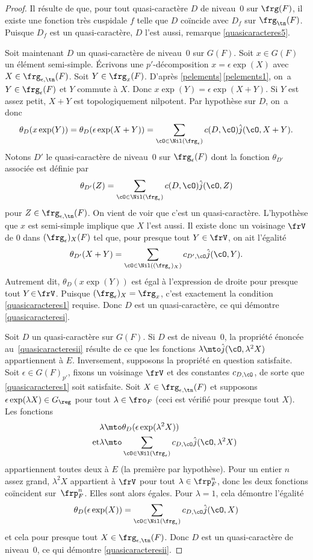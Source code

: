 \begin{proof}
Il résulte de \cite[Lem.\,6.3(iii)]{W1} que, pour tout quasi-caractère $D$ de niveau~$0$ sur $\frg(F)$, il existe une fonction très cuspidale $f$ telle que $D$ coïncide avec $D_{f}$ sur $\frg_{\tn}(F)$. Puisque $D_{f}$ est un quasi-caractère, $D$ l'est aussi, \cf remarque \eqref{quasicaracteres5}.

Soit maintenant $D$ un quasi-caractère de niveau~$0$ sur $G(F)$. Soit $x\in G(F)$ un élément semi-simple. Écrivons une $p'$-décomposition $x=\epsilon \exp(X)$ avec $X\in \frg_{\epsilon,\tn}(F)$. Soit $Y\in \frg_{x}(F)$. D'après \ref{pelements}\,\eqref{pelements1}, on~a $Y\in \frg_{\epsilon}(F)$ et $Y$ commute à $X$. Donc $x\exp(Y)=\epsilon \exp(X+Y)$. Si $Y$ est assez petit, $X+Y$ est topologiquement nilpotent. Par hypothèse sur $D$, on~a donc
\[
\theta_{D}(x \exp(Y))=\theta_{D}(\epsilon \exp(X+Y))=\sum_{\cO\in \Nil(\frg_{\epsilon})}c(D,\cO)\hat{j}(\cO,X+Y).
\]
Notons $D'$ le quasi-caractère de niveau~$0$ sur $\frg_{\epsilon}(F)$ dont la fonction $\theta_{D'}$ associée est définie par
\[
\theta_{D'}(Z)= \sum_{\cO\in \Nil(\frg_{\epsilon})}c(D,\cO)\hat{j}(\cO,Z)
\]
pour $Z\in \frg_{\epsilon,\tn}(F)$. On vient de voir que c'est un quasi-caractère. L'hypothèse que $x$ est semi-simple implique que $X$ l'est aussi. Il existe donc un voisinage $\frV$ de $0$ dans $(\frg_{\epsilon})_{X}(F)$ tel que, pour presque tout $Y\in \frV$, on ait l'égalité
\[
\theta_{D'}(X+Y)=\sum_{\cO\in \Nil((\frg_{\epsilon})_{X})}c_{D',\cO}\hat{j}(\cO,Y).
\]
Autrement dit, $\theta_{D}(x \exp(Y))$ est égal à l'expression de droite pour presque tout \hbox{$Y\!\in\!\frV$}. Puisque $(\frg_{\epsilon})_{X}=\frg_{x}$, c'est exactement la condition \eqref{quasicaracteres1} requise. Donc $D$ est un quasi-caractère, ce qui démontre \eqref{quasicaracteresi}.

Soit $D$ un quasi-caractère sur $G(F)$. Si $D$ est de niveau~$0$, la propriété énoncée au~\eqref{quasicaracteresii} résulte de ce que les fonctions $\lambda\mto \hat{j}(\cO,\lambda^2X)$ appartiennent à $E$. Inversement, supposons la propriété en question satisfaite. Soit $\epsilon\in G(F)_{p'}$, fixons un voisinage $\frV$ et des constantes $c_{D,\cO}$, de sorte que \eqref{quasicaracteres1} soit satisfaite. Soit $X\in \frg_{\epsilon,\tn}(F)$ et supposons $\epsilon \exp(\lambda X)\in G_{\reg}$ pour tout $\lambda\in \fro_{F}$ (ceci est vérifié pour presque tout $X$). Les fonctions
\begin{align*}
\lambda&\mto \theta_{D}(\epsilon \exp(\lambda^2X))
\\
\tag*{et}
\lambda&\mto \sum_{\cO\in \Nil(\frg_{\epsilon})}c_{D,\cO}\hat{j}(\cO,\lambda^2X)
\end{align*}
appartiennent toutes deux à $E$ (la première par hypothèse). Pour un entier $n$ assez grand, $\lambda^2 X$ appartient à $\frV$ pour tout $\lambda\in \frp_{F}^n$, donc les deux fonctions coïncident sur~$\frp_{F}^n$. Elles sont alors égales. Pour $\lambda=1$, cela démontre l'égalité
\[
\theta_{D}(\epsilon \exp(X))=\sum_{\cO\in \Nil(\frg_{\epsilon})}c_{D,\cO}\hat{j}(\cO,X)
\]
et cela pour presque tout $X\in \frg_{\epsilon,\tn}(F)$. Donc $D$ est un quasi-caractère de niveau~$0$, ce qui démontre \eqref{quasicaracteresii}.


\end{proof}
